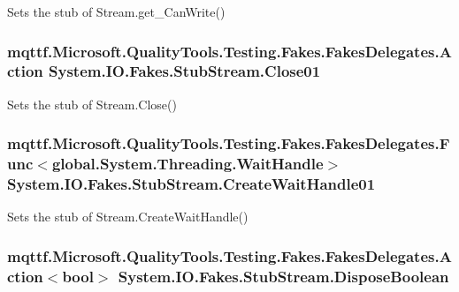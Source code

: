 Sets the stub of Stream.\-get\-\_\-\-Can\-Write()

\hypertarget{class_system_1_1_i_o_1_1_fakes_1_1_stub_stream_aef697cd33d1d6e72c48dbdd1aeab0d73}{
\subsubsection[{Close01}]{\setlength{\rightskip}{0pt plus 5cm}mqttf.\-Microsoft.\-Quality\-Tools.\-Testing.\-Fakes.\-Fakes\-Delegates.\-Action System.\-I\-O.\-Fakes.\-Stub\-Stream.\-Close01}}\label{class_system_1_1_i_o_1_1_fakes_1_1_stub_stream_aef697cd33d1d6e72c48dbdd1aeab0d73}


Sets the stub of Stream.\-Close()

\hypertarget{class_system_1_1_i_o_1_1_fakes_1_1_stub_stream_a54a5a447b0dda3bdb22e216a0bf606f2}{
\subsubsection[{Create\-Wait\-Handle01}]{\setlength{\rightskip}{0pt plus 5cm}mqttf.\-Microsoft.\-Quality\-Tools.\-Testing.\-Fakes.\-Fakes\-Delegates.\-Func$<$global.\-System.\-Threading.\-Wait\-Handle$>$ System.\-I\-O.\-Fakes.\-Stub\-Stream.\-Create\-Wait\-Handle01}}\label{class_system_1_1_i_o_1_1_fakes_1_1_stub_stream_a54a5a447b0dda3bdb22e216a0bf606f2}


Sets the stub of Stream.\-Create\-Wait\-Handle()

\hypertarget{class_system_1_1_i_o_1_1_fakes_1_1_stub_stream_a63fae155c7edaaca604d7e8658088f75}{
\subsubsection[{Dispose\-Boolean}]{\setlength{\rightskip}{0pt plus 5cm}mqttf.\-Microsoft.\-Quality\-Tools.\-Testing.\-Fakes.\-Fakes\-Delegates.\-Action$<$bool$>$ System.\-I\-O.\-Fakes.\-Stub\-Stream.\-Dispose\-Boolean}}\label{class_system_1_1_i_o_1_1_fakes_1_1_stub_stream_a63fae155c7edaaca604d7e8658088f75}


